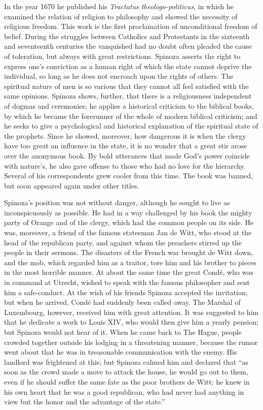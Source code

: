 \documentclass[12pt]{book}
\newcommand{\opage}[1]{\marginnote{\footnotesize\textit{[#1]}}}
\begin{document}
In the year 1670 he published his \textit{Tractatus theologo-politicus}, in which he
examined the relation of religion to philosophy and showed the necessity of religious
freedom. This work is the first proclamation of unconditional freedom of belief.
During the struggles between Catholics and Protestants in the sixteenth and
seventeenth centuries the vanquished had no doubt often pleaded the cause of
toleration, but always with great restrictions. Spinoza asserts the right to express
one's conviction as a human right of which the state cannot deprive the individual,
so long as he does not encroach upon the rights of others. The spiritual nature of
men is so various that they cannot all feel satisfied with the same opinions. Spinoza
shows, further, that there is a religiousness independent of dogmas and ceremonies;
he applies a historical criticism to the biblical books, by which he became the
forerunner of the whole of modern biblical criticism; and he seeks to give a
psychological and historical explanation of the spiritual state of the prophets.
Since he showed, moreover, how dangerous it is when the clergy have too great an
influence in the state, it is no wonder that a great stir arose over the anonymous
book. By bold utterances that made God's power coincide with nature's, he also gave
offense to \opage{33}those who had no love for the hierarchy. Several of his
correspondents grew cooler from this time. The book was banned, but soon appeared
again under other titles.

Spinoza's position was not without danger, although he sought to live as
inconspicuously as possible. He had in a way challenged by his book the mighty party
of Orange and of the clergy, which had the common people on its side. He was,
moreover, a friend of the famous statesman Jan de Witt, who stood at the head of the
republican party, and against whom the preachers stirred up the people in their
sermons. The disasters of the French war brought de Witt down, and the mob, which
regarded him as a traitor, tore him and his brother to pieces in the most horrible
manner. At about the same time the great Condé, who was in command at Utrecht, wished
to speak with the famous philosopher and sent him a safe-conduct. At the wish of his
friends Spinoza accepted the invitation; but when he arrived, Condé had suddenly been
called away. The Marshal of Luxembourg, however, received him with great attention. It
was suggested to him that he dedicate a work to Louis XIV, who would then give him a
yearly pension; but Spinoza would not hear of it. When he came back to The Hague,
people crowded together outside his lodging in a threatening manner, because the
rumor went about that he was in treasonable communication with the enemy. His
landlord was frightened at this; but Spinoza calmed him and declared that ``as soon
as the crowd made a move to attack the house, he would go out to them, even if he
should suffer \opage{34}the same fate as the poor brothers de Witt; he knew in his own
heart that he was a good republican, who had never had anything in view but the honor
and the advantage of the state.''
\end{document}
